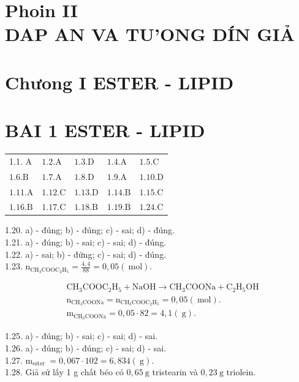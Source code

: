 \documentclass[10pt]{article}
\begin{document}
\section*{Phoin II \\
 DAP AN VA TU'ONG DÍN GIẢ}
\section*{Chưong I ESTER - LIPID}
\section*{BAI 1 ESTER - LIPID}
\begin{center}
\begin{tabular}{lllll}
1.1. A & $1.2 . \mathrm{A}$ & $1.3 . \mathrm{D}$ & $1.4 . \mathrm{A}$ & $1.5 . \mathrm{C}$ \\
$1.6 . \mathrm{B}$ & $1.7 . \mathrm{A}$ & $1.8 . \mathrm{D}$ & $1.9 . \mathrm{A}$ & $1.10 . \mathrm{D}$ \\
$1.11 . \mathrm{A}$ & $1.12 . \mathrm{C}$ & $1.13 . \mathrm{D}$ & $1.14 . \mathrm{B}$ & $1.15 . \mathrm{C}$ \\
$1.16 . \mathrm{B}$ & $1.17 . \mathrm{C}$ & $1.18 . \mathrm{B}$ & $1.19 . \mathrm{B}$ & $1.24 . \mathrm{C}$ \\
\end{tabular}
\end{center}

1.20. a) - đúng; b) - đúng; c) - sai; d) - đúng.\\
1.21. a) - đúng; b) - sai; c) - sai; d) - đúng.\\
1.22. a) - sai; b) - đứng; c) - sai; d) - đúng.\\
1.23. $\mathrm{n}_{\mathrm{CH}_{3} \mathrm{COOC}_{2} \mathrm{H}_{5}}=\frac{4,4}{88}=0,05(\mathrm{~mol})$.

$$
\begin{aligned}
& \mathrm{CH}_{3} \mathrm{COOC}_{2} \mathrm{H}_{5}+\mathrm{NaOH} \longrightarrow \mathrm{CH}_{3} \mathrm{COONa}+\mathrm{C}_{2} \mathrm{H}_{5} \mathrm{OH} \\
& \mathrm{n}_{\mathrm{CH}_{3} \mathrm{COONa}}=\mathrm{n}_{\mathrm{CH}_{3} \mathrm{COOC}_{2} \mathrm{H}_{5}}=0,05(\mathrm{~mol}) . \\
& \mathrm{m}_{\mathrm{CH}_{3} \mathrm{COONa}}=0,05 \cdot 82=4,1(\mathrm{~g}) .
\end{aligned}
$$

1.25. a) - đúng; b) - sai; c) - sai; d) - sai.\\
1.26. a) - đúng; b) - đúng; c) - sai; d) - sai.\\
1.27. $\mathrm{m}_{\text {ester }}=0,067 \cdot 102=6,834(\mathrm{~g})$.\\
1.28. Giả sử lấy 1 g chất béo có $0,65 \mathrm{~g}$ tristearin và $0,23 \mathrm{~g}$ triolein.
\end{document}
